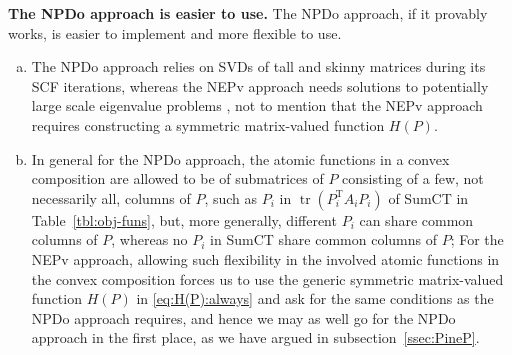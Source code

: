 \documentclass[11pt]{article}
\DeclareMathOperator{\tr}{tr}
\DeclareMathOperator{\T}{T}
\theoremstyle{definition}
\numberwithin{equation}{section}
\begin{document}
\smallskip
{\bf The NPDo approach is easier to use.}
The NPDo approach, if it provably works, is easier to implement and more flexible
to use.
\begin{enumerate}[(a)]
  \item The NPDo approach relies on
        SVDs of tall and skinny matrices \cite{demm:1997,govl:2013} during its SCF
        iterations, whereas the NEPv approach needs solutions to potentially large scale eigenvalue problems \cite{bddrv:2000,lesy:1998,li:2015,parl:1998,saad:1992}, not to mention that the NEPv approach requires constructing a symmetric matrix-valued function $H(P)$.
  \item In general for the NPDo approach,
        the atomic functions in a convex composition are allowed to be of submatrices of $P$
        consisting of a few, not necessarily all, columns of $P$, such as $P_i$ in
        $\tr(P_i^{\T}A_iP_i)$ of SumCT in Table~\ref{tbl:obj-funs}, but, more generally,
        different $P_i$ can share common columns of $P$, whereas no $P_i$ in SumCT share common columns of $P$;
        For the NEPv approach, allowing such flexibility in the involved atomic functions in the convex composition
        forces us to use  the generic symmetric matrix-valued function $H(P)$ in \eqref{eq:H(P):always}
        and ask for the same conditions as the NPDo approach requires, and hence we may as well go for
        the NPDo approach in the first place,
        as we have argued in subsection~\ref{ssec:PineP}.
\end{enumerate}
\end{document}
